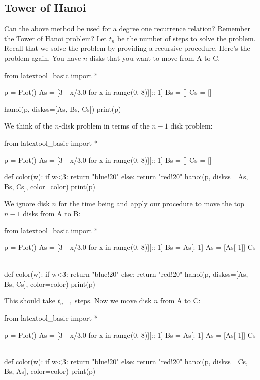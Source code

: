 \subsection{Tower of Hanoi}

Can the above method be used for a degree one recurrence relation?
Remember the Tower of Hanoi problem?
Let $t_n$ be the number of steps to solve the problem.
Recall that we solve the problem by providing
a recursive procedure.
Here's the problem again.
You have $n$ disks that you want to move from A to C.

\begin{python}
from latextool_basic import *

p = Plot()
As = [3 - x/3.0 for x in range(0, 8)][::-1]
Bs = []
Cs = []
    
hanoi(p, diskss=[As, Bs, Cs])
print(p)
\end{python}

We think of the $n$-disk problem in terms of the
$n-1$ disk problem:

\begin{python}
from latextool_basic import *

p = Plot()
As = [3 - x/3.0 for x in range(0, 8)][::-1]
Bs = []
Cs = []

def color(w):
    if w<3: return "blue!20"
    else: return "red!20"
hanoi(p, diskss=[As, Bs, Cs], color=color)
print(p)
\end{python}

We ignore disk $n$ for the time being
and apply our procedure to move the top $n-1$ disks from A to B:

\begin{python}
from latextool_basic import *

p = Plot()
As = [3 - x/3.0 for x in range(0, 8)][::-1]
Bs = As[:-1]
As = [As[-1]]
Cs = []

def color(w):
    if w<3: return "blue!20"
    else: return "red!20"
hanoi(p, diskss=[As, Bs, Cs], color=color)
print(p)
\end{python}

This should take $t_{n-1}$ steps.
Now we move disk $n$ from A to C:

\begin{python}
from latextool_basic import *

p = Plot()
As = [3 - x/3.0 for x in range(0, 8)][::-1]
Bs = As[:-1]
As = [As[-1]]
Cs = []

def color(w):
    if w<3: return "blue!20"
    else: return "red!20"
hanoi(p, diskss=[Cs, Bs, As], color=color)
print(p)
\end{python}

